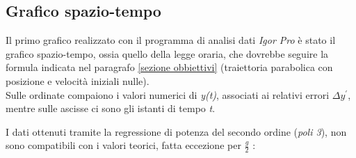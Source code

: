 \documentclass[12pt, a4paper]{article}
\begin{document}
\subsection{Grafico spazio-tempo}
Il primo grafico realizzato con il programma di analisi dati \textit{Igor Pro} è stato il grafico spazio-tempo, ossia quello della legge oraria, che dovrebbe seguire la formula indicata nel paragrafo \ref{sezione obbiettivi} (traiettoria parabolica con posizione e velocità iniziali nulle).\\ 
Sulle ordinate compaiono i valori numerici di \textit{y(t)}, associati ai relativi errori  \textit{$\Delta y^{'}$}, mentre sulle ascisse ci sono gli istanti di tempo \textit{t}. 

I dati ottenuti tramite la regressione di potenza del secondo ordine (\textit{poli 3}), non sono compatibili con i valori teorici, fatta eccezione per $\displaystyle{\frac{g}{2}}$ :
\end{document}
